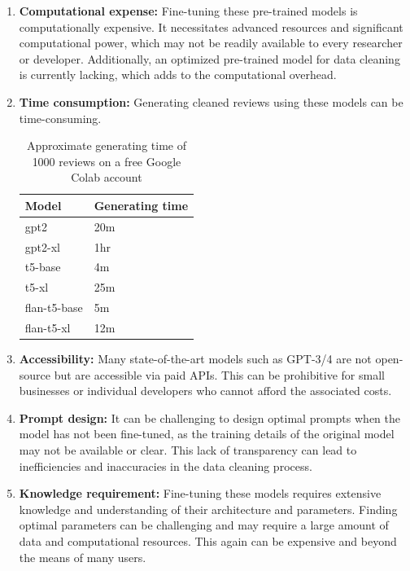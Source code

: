 \documentclass{article}
\begin{document}
\begin{enumerate}
    \item \textbf{Computational expense:} Fine-tuning these pre-trained models is computationally expensive. It necessitates advanced resources and significant computational power, which may not be readily available to every researcher or developer. Additionally, an optimized pre-trained model for data cleaning is currently lacking, which adds to the computational overhead.


    \item \textbf{Time consumption:} Generating cleaned reviews using these models can be time-consuming.
    \begin{table}[h]
    \centering
    \begin{tabular}{ll}
    \toprule
    \textbf{Model} & \textbf{Generating time} \\
    \midrule
    gpt2 & 20m\\
    gpt2-xl & 1hr\\
    t5-base & 4m\\
    t5-xl & 25m\\
    flan-t5-base & 5m\\
    flan-t5-xl & 12m \\
    \bottomrule
    \end{tabular}
    \caption{Approximate generating time of 1000 reviews on a free Google Colab account}
    \end{table}
    
    
    
    \item \textbf{Accessibility:} Many state-of-the-art models such as GPT-3/4 are not open-source but are accessible via paid APIs. This can be prohibitive for small businesses or individual developers who cannot afford the associated costs.
    
    \item \textbf{Prompt design:} It can be challenging to design optimal prompts when the model has not been fine-tuned, as the training details of the original model may not be available or clear. This lack of transparency can lead to inefficiencies and inaccuracies in the data cleaning process.
    
    \item \textbf{Knowledge requirement:} Fine-tuning these models requires extensive knowledge and understanding of their architecture and parameters. Finding optimal parameters can be challenging and may require a large amount of data and computational resources. This again can be expensive and beyond the means of many users.


\end{enumerate}
\end{document}
